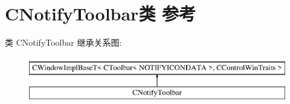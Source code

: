 \hypertarget{class_c_notify_toolbar}{}\section{C\+Notify\+Toolbar类 参考}
\label{class_c_notify_toolbar}
类 C\+Notify\+Toolbar 继承关系图\+:\begin{figure}[H]
\begin{center}
\leavevmode
\includegraphics[height=2.000000cm]{class_c_notify_toolbar}
\end{center}
\end{figure}
